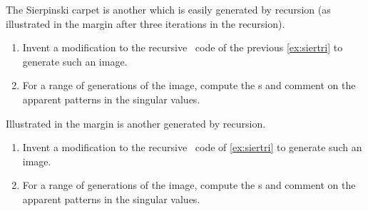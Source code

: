 \begin{exercise}  
The Sierpinski carpet is another  which is easily generated by recursion (as illustrated in the margin after three iterations in the recursion).
\marginpar{}
\begin{enumerate}
\item Invent a modification to the recursive \script\ code of the previous \cref{ex:siertri} to generate such an image.

\item For a range of generations of the image, compute the s and comment on the apparent patterns in the singular values.
\end{enumerate}
\end{exercise}


\begin{exercise}  
Illustrated in the margin is another  generated by recursion.
\marginpar{}
\begin{enumerate}
\item Invent a modification to the recursive \script\ code of \cref{ex:siertri} to generate such an image.

\item For a range of generations of the image, compute the s and comment on the apparent patterns in the singular values.
\end{enumerate}
\end{exercise}





